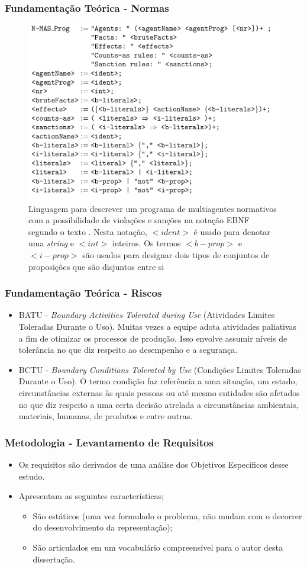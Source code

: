 \documentclass{beamer}
\begin{document}
\begin{frame}
	\frametitle{Fundamentação Teórica - Normas}
	\begin{figure}[H]
	  \centering
	  \includegraphics[width=0.5\linewidth]{figure/masprogram.png} 
	  \caption{Linguagem para descrever um programa de multiagentes normativos com a possibilidade de violações e sanções na notação EBNF segundo o texto \cite{dastaniframework}. Nesta notação, $<ident>$ é usado para denotar uma \textit{string} e $<int>$ inteiros. Os termos $<b-prop>$ e $<i-prop>$ são usados para designar dois tipos de conjuntos de proposições que são disjuntos entre si}
	  \label{descreveprograma}
	\end{figure}
\end{frame}


\begin{frame}
	\frametitle{Fundamentação Teórica - Riscos}
	\begin{itemize}
		\item BATU - \textit{Boundary Activities Tolerated during Use} (Atividades Limites Toleradas Durante o Uso). Muitas vezes a equipe adota atividades paliativas a fim de otimizar os processos de produção. Isso envolve assumir níveis de tolerância no que diz respeito ao desempenho e a segurança. 
		\item BCTU - \textit{Boundary Conditions Tolerated by Use} (Condições Limites Toleradas Durante o Uso). O termo condição faz referência a uma situação, um estado, circunstâncias externas às quais pessoas ou até mesmo entidades são afetados no que diz respeito a uma certa decisão atrelada a circunstâncias ambientais, materiais, humanas, de produtos e entre outras.
	\end{itemize}
\end{frame}

\begin{frame}
	\frametitle{Metodologia - Levantamento de Requisitos}
	\begin{itemize}
		\item Os requisitos são derivados de uma análise dos Objetivos Específicos desse estudo.
		\item Apresentam as seguintes características; 
		\begin{itemize}
			\item São estáticos (uma vez formulado o problema, não mudam com o decorrer do desenvolvimento da representação);
			\item São articulados em um vocabulário compreensível para o autor desta dissertação. 			
		\end{itemize}
	\end{itemize}
\end{frame}
\end{document}
